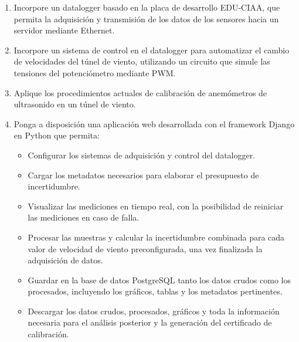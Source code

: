 \begin{enumerate}
    \item Incorpore un datalogger basado en la placa de desarrollo EDU-CIAA, que permita la adquisición y transmisión de los datos de los sensores hacia un servidor mediante Ethernet.
    \item Incorpore un sistema de control en el datalogger para automatizar el cambio de velocidades del túnel de viento, utilizando un circuito que simule las tensiones del potenciómetro mediante PWM.
    \item Aplique los procedimientos actuales de calibración de anemómetros de ultrasonido en un túnel de viento.
    \item Ponga a disposición una aplicación web desarrollada con el framework Django en Python que permita:
    \begin{itemize}
        \item Configurar los sistemas de adquisición y control del datalogger.
        \item Cargar los metadatos necesarios para elaborar el presupuesto de incertidumbre.
        \item Visualizar las mediciones en tiempo real, con la posibilidad de reiniciar las mediciones en caso de falla.
        \item Procesar las muestras y calcular la incertidumbre combinada para cada valor de velocidad de viento preconfigurada, una vez finalizada la adquisición de datos.
        \item Guardar en la base de datos PostgreSQL tanto los datos crudos como los procesados, incluyendo los gráficos, tablas y los metadatos pertinentes.
        \item Descargar los datos crudos, procesados, gráficos y toda la información necesaria para el análisis posterior y la generación del certificado de calibración.
    \end{itemize}
\end{enumerate}

